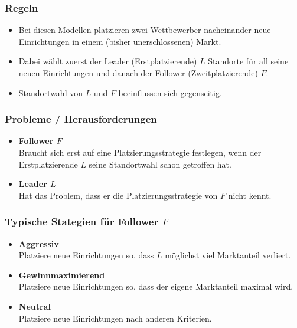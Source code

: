       \subsubsection{Regeln} %
      \label{ssub:regeln}
        \begin{itemize}
          \item Bei diesen Modellen platzieren zwei Wettbewerber nacheinander neue Einrichtungen in einem (bisher unerschlossenen) Markt.
          \item Dabei wählt zuerst der Leader (Erstplatzierende) $L$ Standorte für all seine neuen Einrichtungen und danach der Follower (Zweitplatzierende) $F$.
          \item Standortwahl von $L$ und $F$ beeinflussen sich gegenseitig.
        \end{itemize}

      \subsubsection{Probleme / Herausforderungen} %
      \label{ssub:probleme_herausforderungen}
        \begin{itemize}
          \item \textbf{Follower $F$}\\
           Braucht sich erst auf eine Platzierungsstrategie festlegen, wenn der Erstplatzierende $L$ seine Standortwahl schon getroffen hat.
          \item \textbf{Leader $L$}\\
          Hat das Problem, dass er die Platzierungsstrategie von $F$ nicht kennt.
        \end{itemize}

      \subsubsection{Typische Stategien für Follower $F$} %
      \label{ssub:typische_stategien_für_follower}

        \begin{itemize}
          \item \textbf{Aggressiv}\\
          Platziere neue Einrichtungen so, dass $L$ möglichst viel Marktanteil verliert. 

          \item \textbf{Gewinnmaximierend}\\
          Platziere neue Einrichtungen so, dass der eigene Marktanteil maximal wird.

          \item \textbf{Neutral}\\
          Platziere neue Einrichtungen nach anderen Kriterien.
        \end{itemize}
      
